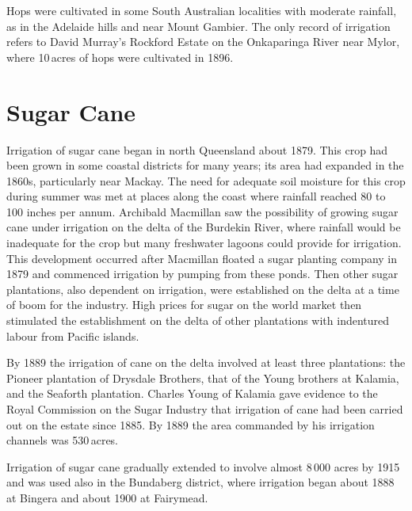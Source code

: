 Hops were cultivated in some South Australian localities with moderate
rainfall, as in the Adelaide hills and near Mount Gambier.  The only record of irrigation refers to David Murray's
Rockford Estate on the Onkaparinga River 
near Mylor,  where 10\,acres of hops were cultivated in
1896.

\section*{Sugar Cane} 

Irrigation of sugar cane began in north Queensland about 1879.  This
crop had been grown in some coastal districts for many years; its area
had expanded in the 1860s, particularly near Mackay. 
The need for adequate soil moisture for this crop during summer was
met at places along the coast where rainfall reached 80 to 100 inches
per annum.  Archibald Macmillan  saw the
possibility of growing sugar cane under irrigation on the delta of the
Burdekin River,  where rainfall would be
inadequate for the crop but many freshwater lagoons could provide for
irrigation.  This development occurred after Macmillan floated a sugar
planting company in 1879 and commenced irrigation by pumping from
these ponds.  Then other sugar plantations, also dependent on
irrigation, were established on the delta at a time of boom for the
industry.  High prices for sugar on the world market then stimulated
the establishment on the delta of other plantations with indentured
labour from Pacific islands.

By 1889 the irrigation of cane on the delta involved at least three
plantations: the Pioneer plantation of Drysdale Brothers,
 that of the
Young brothers at Kalamia,  and the Seaforth
plantation.  Charles Young  of Kalamia gave evidence
to the Royal Commission on the Sugar Industry that irrigation of cane
had been carried out on the estate since 1885. By 1889 the area
commanded by his irrigation channels was 530\,acres.

Irrigation of sugar cane gradually extended to involve almost 8\,000
acres by 1915 and was used also in the Bundaberg
 district, where
irrigation began about 1888 at Bingera  and about 1900
at Fairymead.

